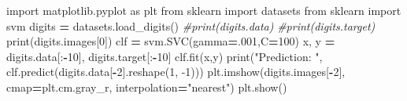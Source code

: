 \documentclass[]{book}
\newenvironment{Shaded}{\begin{snugshade}}{\end{snugshade}}
\newcommand{\BuiltInTok}[1]{#1}
\newcommand{\CommentTok}[1]{\textcolor[rgb]{0.56,0.35,0.01}{\textit{#1}}}
\newcommand{\DecValTok}[1]{\textcolor[rgb]{0.00,0.00,0.81}{#1}}
\newcommand{\ImportTok}[1]{#1}
\newcommand{\NormalTok}[1]{#1}
\newcommand{\OperatorTok}[1]{\textcolor[rgb]{0.81,0.36,0.00}{\textbf{#1}}}
\newcommand{\StringTok}[1]{\textcolor[rgb]{0.31,0.60,0.02}{#1}}
\begin{document}
\begin{Shaded}
\begin{Highlighting}[]
\ImportTok{import}\NormalTok{ matplotlib.pyplot }\ImportTok{as}\NormalTok{ plt}
\ImportTok{from}\NormalTok{ sklearn }\ImportTok{import}\NormalTok{ datasets}
\ImportTok{from}\NormalTok{ sklearn }\ImportTok{import}\NormalTok{ svm}
\NormalTok{digits }\OperatorTok{=}\NormalTok{ datasets.load_digits()}
\CommentTok{#print(digits.data)}
\CommentTok{#print(digits.target)}
\BuiltInTok{print}\NormalTok{(digits.images[}\DecValTok{0}\NormalTok{])}
\NormalTok{clf }\OperatorTok{=}\NormalTok{ svm.SVC(gamma}\OperatorTok{=}\NormalTok{.}\DecValTok{001}\NormalTok{,C}\OperatorTok{=}\DecValTok{100}\NormalTok{)}
\NormalTok{x, y }\OperatorTok{=}\NormalTok{ digits.data[:}\OperatorTok{-}\DecValTok{10}\NormalTok{], digits.target[:}\OperatorTok{-}\DecValTok{10}\NormalTok{]}
\NormalTok{clf.fit(x,y)}
\BuiltInTok{print}\NormalTok{(}\StringTok{"Prediction: "}\NormalTok{, clf.predict(digits.data[}\OperatorTok{-}\DecValTok{2}\NormalTok{].reshape(}\DecValTok{1}\NormalTok{, }\DecValTok{-1}\NormalTok{)))}
\NormalTok{plt.imshow(digits.images[}\OperatorTok{-}\DecValTok{2}\NormalTok{], cmap}\OperatorTok{=}\NormalTok{plt.cm.gray_r, interpolation}\OperatorTok{=}\StringTok{"nearest"}\NormalTok{)}
\NormalTok{plt.show()}
\end{Highlighting}
\end{Shaded}


\end{document}

